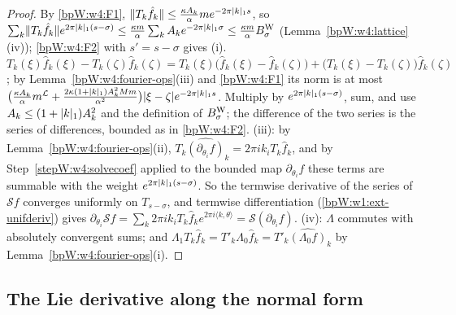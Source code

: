 \begin{proof}
\label{stepW:w4:solvecoef}
By \ref{bpW:w4:F1}, $\lVert T_k\hat f_k\rVert\le\frac{\kappa A_k}\alpha me^{-2\pi\lvert k\rvert_1s}$, so
$\sum_k\lVert T_k\hat f_k\rVert e^{2\pi\lvert k\rvert_1(s-\sigma)}\le\frac{\kappa m}\alpha\sum_kA_ke^{-2\pi\lvert k\rvert_1\sigma}\le\frac{\kappa m}\alpha B^{\rm W}_\sigma$
(Lemma~\ref{bpW:w4:lattice}(iv)); \ref{bpW:w4:F2} with $s'=s-\sigma$ gives (i).
\label{stepW:w4:solvediff}
$T_k(\xi)\hat f_k(\xi)-T_k(\zeta)\hat f_k(\zeta)=T_k(\xi)\bigl(\hat f_k(\xi)-\hat f_k(\zeta)\bigr)+\bigl(T_k(\xi)-T_k(\zeta)\bigr)\hat f_k(\zeta)$;
by Lemma~\ref{bpW:w4:fourier-ops}(iii) and \ref{bpW:w4:F1} its norm is at most
$\bigl(\frac{\kappa A_k}\alpha m^{\mathcal L}+\frac{2\kappa(1+\lvert k\rvert_1)A_k^2Mm}{\alpha^2}\bigr)\lvert \xi-\zeta\rvert e^{-2\pi\lvert k\rvert_1s}$.
Multiply by $e^{2\pi\lvert k\rvert_1(s-\sigma)}$, sum, and use $A_k\le(1+\lvert k\rvert_1)A_k^2$ and the definition of $B^{\rm W}_\sigma$; the
difference of the two series is the series of differences, bounded as in \ref{bpW:w4:F2}.
\label{stepW:w4:solvecomm}
(iii): by Lemma~\ref{bpW:w4:fourier-ops}(ii), $T_k\widehat{(\partial_{\theta_i}f)}_k=2\pi ik_iT_k\hat f_k$, and by
Step~\ref{stepW:w4:solvecoef} applied to the bounded map $\partial_{\theta_i}f$ these terms are summable with the
weight $e^{2\pi\lvert k\rvert_1(s-\sigma)}$. So the termwise derivative of the series of $\mathcal Sf$ converges uniformly on
$T_{s-\sigma}$, and termwise differentiation (\ref{bpW:w1:ext-unifderiv}) gives
$\partial_{\theta_i}\mathcal Sf=\sum_k2\pi ik_iT_k\hat f_ke^{2\pi i\langle k,\theta\rangle}=\mathcal S(\partial_{\theta_i}f)$.
\label{stepW:w4:solvelin}
(iv): $\Lambda$ commutes with absolutely convergent sums; and $\Lambda_1T_k\hat f_k=T'_k\Lambda_0\hat f_k=T'_k\widehat{(\Lambda_0f)}_k$
by Lemma~\ref{bpW:w4:fourier-ops}(i).
\end{proof}

\subsection{The Lie derivative along the normal form}\label{bpW:w4:lie-sec}

